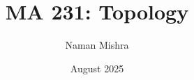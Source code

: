 \documentclass[12pt]{report}
\title{MA 231: Topology}
\author{Naman Mishra}
\date{August 2025}
\begin{document}
\maketitle
\tableofcontents
\listoflecture
    
    
    
\end{document}
